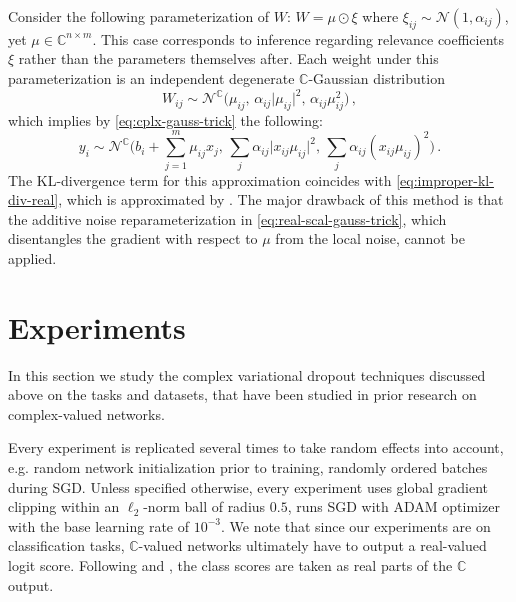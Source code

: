 \documentclass[a4paper,10pt]{article}
\newcommand{\cplx}{\mathbb{C}}
\begin{document}
Consider the following parameterization of $W$: $
  W = \mu \odot \xi
$ where $
  \xi_{ij} \sim \mathcal{N}(1, \alpha_{ij})
$, yet $\mu \in \cplx^{n \times m}$. This case corresponds to inference regarding
relevance coefficients $\xi$ rather than the parameters themselves after. Each weight
under this parameterization is an independent degenerate $\cplx$-Gaussian distribution
\begin{equation}  \label{eq:real-scal-gauss-vi}
  W_{ij}
    \sim \mathcal{N}^{\cplx} \bigl(
      \mu_{ij},
      \, \alpha_{ij} \lvert \mu_{ij} \rvert^2,
      \, \alpha_{ij} \mu_{ij}^2
    \bigr)
  \,,
\end{equation}
which implies by \eqref{eq:cplx-gauss-trick} the following:
\begin{equation}  \label{eq:real-scal-gauss-trick}
  y_i
    \sim \mathcal{N}^{\cplx}\bigl(
      b_i + \sum_{j=1}^m \mu_{ij} x_j,
      \, \sum_j \alpha_{ij} \lvert x_{ij} \mu_{ij}\rvert^2,
      \, \sum_j \alpha_{ij} (x_{ij} \mu_{ij})^2
    \bigr)
    \,.
\end{equation}
The KL-divergence term for this approximation coincides with \eqref{eq:improper-kl-div-real},
which is approximated by \citet{molchanov_variational_2017}. The major drawback of this method
is that the additive noise reparameterization in \eqref{eq:real-scal-gauss-trick}, which
disentangles the gradient with respect to $\mu$ from the local noise, cannot be applied.





\section{Experiments} %
\label{sec:experiments}

In this section we study the complex variational dropout techniques discussed above
on the tasks and datasets, that have been studied in prior research on complex-valued networks.

Every experiment is replicated several times to take random effects into account, e.g.
random network initialization prior to training, randomly ordered batches during SGD.
Unless specified otherwise, every experiment uses global gradient clipping within an
$\ell_2$-norm ball of radius $0.5$, runs SGD with ADAM optimizer with the base learning
rate of $10^{-3}$. We note that since our experiments are on classification tasks,
$\cplx$-valued networks ultimately have to output a real-valued logit score. Following
\citet{wolter_complex_2018} and \citet{trabelsi_deep_2017}, the class scores are taken
as real parts of the $\cplx$ output.
\end{document}
